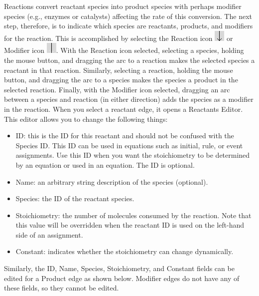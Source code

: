 \documentclass[titlepage,11pt]{article}
\begin{document}
Reactions convert reactant species into product species with perhaps modifier species (e.g., enzymes or catalysts) affecting the rate of this conversion.  The next step, therefore, is to indicate which species are reactants, products, and modifiers for the reaction.  This is accomplished by selecting the Reaction icon \includegraphics{../gui/icons/modelview/reaction_selected} or Modifier icon \includegraphics{../gui/icons/modelview/modifier_selected}.  With the Reaction icon selected, selecting a species, holding the mouse button, and dragging the arc to a reaction makes the selected species a reactant in that reaction.  Similarly, selecting a reaction, holding the mouse button, and dragging the arc to a species makes the species a product in the selected reaction.  Finally, with the Modifier icon selected, dragging an arc between a species and reaction (in either direction) adds the species as a modifier in the reaction.  When you select a reactant edge, it opens a Reactants Editor.  This editor allows you to change the following things:
\begin{itemize}
\item ID: this is the ID for this reactant and should not be confused with the Species ID.  This ID can be used in equations such as initial, rule, or event assignments.  Use this ID when you want the stoichiometry to be determined by an equation or used in an equation.  The ID is optional.
\item Name: an arbitrary string description of the species (optional).
\item Species: the ID of the reactant species.
\item Stoichiometry: the number of molecules consumed by the reaction.  Note that this value will be overridden when the reactant ID is used on the left-hand side of an assignment.
\item Constant: indicates whether the stoichiometry can change dynamically.  
\end{itemize}
Similarly, the ID, Name, Species, Stoichiometry, and Constant fields can be edited for a Product edge as shown below.  Modifier edges do not have any of these fields, so they cannot be edited.
\end{document}
